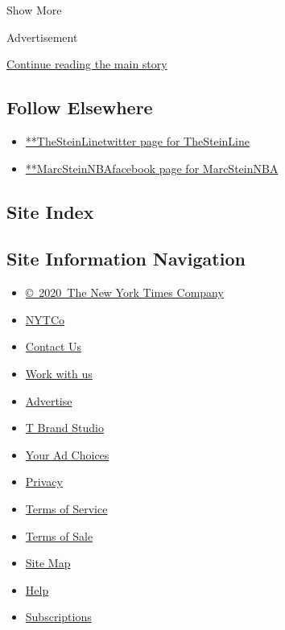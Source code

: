 Show More

Advertisement

\protect\hyperlink{after-mid2}{Continue reading the main story}

\hypertarget{follow-elsewhere}{%
\subsection{Follow Elsewhere}\label{follow-elsewhere}}

\begin{itemize}
\tightlist
\item
  \href{https://twitter.com/TheSteinLine}{**TheSteinLinetwitter page for
  TheSteinLine}
\item
  \href{https://www.facebook.com/MarcSteinNBA}{**MarcSteinNBAfacebook
  page for MarcSteinNBA}
\end{itemize}

\hypertarget{site-index}{%
\subsection{Site Index}\label{site-index}}

\hypertarget{site-information-navigation}{%
\subsection{Site Information
Navigation}\label{site-information-navigation}}

\begin{itemize}
\tightlist
\item
  \href{https://help.nytimes.com/hc/en-us/articles/115014792127-Copyright-notice}{©~2020~The
  New York Times Company}
\end{itemize}

\begin{itemize}
\tightlist
\item
  \href{https://www.nytco.com/}{NYTCo}
\item
  \href{https://help.nytimes.com/hc/en-us/articles/115015385887-Contact-Us}{Contact
  Us}
\item
  \href{https://www.nytco.com/careers/}{Work with us}
\item
  \href{https://nytmediakit.com/}{Advertise}
\item
  \href{http://www.tbrandstudio.com/}{T Brand Studio}
\item
  \href{https://www.nytimes.com/privacy/cookie-policy\#how-do-i-manage-trackers}{Your
  Ad Choices}
\item
  \href{https://www.nytimes.com/privacy}{Privacy}
\item
  \href{https://help.nytimes.com/hc/en-us/articles/115014893428-Terms-of-service}{Terms
  of Service}
\item
  \href{https://help.nytimes.com/hc/en-us/articles/115014893968-Terms-of-sale}{Terms
  of Sale}
\item
  \href{https://spiderbites.nytimes.com}{Site Map}
\item
  \href{https://help.nytimes.com/hc/en-us}{Help}
\item
  \href{https://www.nytimes.com/subscription?campaignId=37WXW}{Subscriptions}
\end{itemize}
